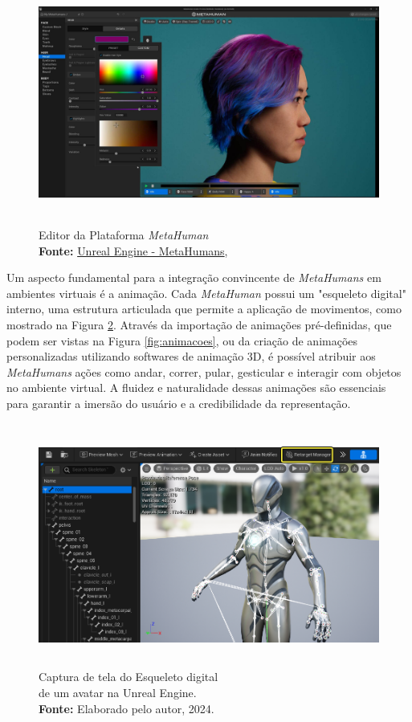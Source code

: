 {\begin{figure}[H]
    \centering
    \includegraphics[height=8cm, keepaspectratio]{img/unreal/metahuman create.jpg}
    \caption{Editor da Plataforma \textit{MetaHuman} \\
        \textbf{Fonte:} \href{https://cdn2.unrealengine.com/metahuman-overview-create-1920x1080-baa630fe8b02.jpg?resize=1&w=900}{Unreal Engine - MetaHumans},  \protect\citep{unrealenginemeta}}
    \label{fig:metahuman creator}
\end{figure}

Um aspecto fundamental para a integração convincente de \textit{MetaHumans} em ambientes virtuais é a animação. Cada \textit{MetaHuman} possui um "esqueleto digital" interno, uma estrutura articulada que permite a aplicação de movimentos, como mostrado na Figura \ref{fig:skeleton}. Através da importação de animações pré-definidas, que podem ser vistas na Figura \ref{fig:animacoes}, ou da criação de animações personalizadas utilizando softwares de animação 3D, é possível atribuir aos \textit{MetaHumans} ações como andar, correr, pular, gesticular e interagir com objetos no ambiente virtual. A fluidez e naturalidade dessas animações são essenciais para garantir a imersão do usuário e a credibilidade da representação.

\begin{figure}[H]
    \centering
    \includegraphics[height=8cm, keepaspectratio]{img/skeleton.png}
    \caption{Captura de tela do Esqueleto digital \\de um avatar na Unreal Engine.\\
        \textbf{Fonte:} Elaborado pelo autor, 2024.}
    \label{fig:skeleton}
\end{figure}

}
